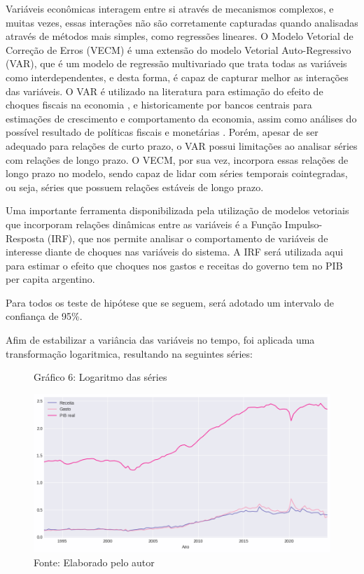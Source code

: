\documentclass[a4paper, 12pt, openany, oneside, brazil]{abntex2}
\begin{document}
Variáveis econômicas interagem entre si através de mecanismos complexos, e muitas vezes, essas interações não são corretamente capturadas quando analisadas através de métodos mais simples, como regressões lineares. O Modelo Vetorial de Correção de Erros (VECM) é uma extensão do modelo Vetorial Auto-Regressivo (VAR), que é um modelo de regressão multivariado que trata todas as variáveis como interdependentes, e desta forma, é capaz de capturar melhor as interações das variáveis. O VAR é utilizado na literatura para estimação do efeito de choques fiscais na economia \cite{Blanchard2002}, e historicamente por bancos centrais para estimações de crescimento e comportamento da economia, assim como análises do possível resultado de políticas fiscais e monetárias \cite{bcb_relatorio_inflacao_2010}. Porém, apesar de ser adequado para relações de curto prazo, o VAR possui limitações ao analisar séries com relações de longo prazo. O VECM, por sua vez, incorpora essas relações de longo prazo no modelo, sendo capaz de lidar com séries temporais cointegradas, ou seja, séries que possuem relações estáveis de longo prazo.

Uma importante ferramenta disponibilizada pela utilização de modelos vetoriais que incorporam relações dinâmicas entre as variáveis é a Função Impulso-Resposta (IRF), que nos permite analisar o comportamento de variáveis de interesse diante de choques nas variáveis do sistema. A IRF será utilizada aqui para estimar o efeito que choques nos gastos e receitas do governo tem no PIB per capita argentino.

Para todos os teste de hipótese que se seguem, será adotado um intervalo de confiança de 95\%.

Afim de estabilizar a variância das variáveis no tempo, foi aplicada uma transformação logaritmica, resultando na seguintes séries:

\begin{figure}[h!]
	\caption*{Gráfico 6: Logaritmo das séries}
	\includegraphics[width=\textwidth]{metodologia/logaritmo}
	\caption*{Fonte: Elaborado pelo autor}
\end{figure}
\end{document}
